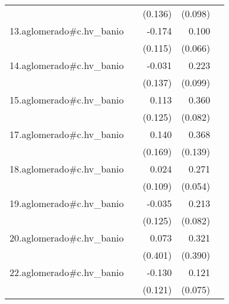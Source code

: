 {\begin{longtable}{l*{4}{D{.}{.}{-1}}}
            &                     &     (0.136)         &     (0.098)         &                     \\
\addlinespace
13.aglomerado#c.hv\_banio&                     &      -0.174         &       0.100         &                     \\
            &                     &     (0.115)         &     (0.066)         &                     \\
\addlinespace
14.aglomerado#c.hv\_banio&                     &      -0.031         &       0.223\sym{*}  &                     \\
            &                     &     (0.137)         &     (0.099)         &                     \\
\addlinespace
15.aglomerado#c.hv\_banio&                     &       0.113         &       0.360\sym{***}&                     \\
            &                     &     (0.125)         &     (0.082)         &                     \\
\addlinespace
17.aglomerado#c.hv\_banio&                     &       0.140         &       0.368\sym{**} &                     \\
            &                     &     (0.169)         &     (0.139)         &                     \\
\addlinespace
18.aglomerado#c.hv\_banio&                     &       0.024         &       0.271\sym{***}&                     \\
            &                     &     (0.109)         &     (0.054)         &                     \\
\addlinespace
19.aglomerado#c.hv\_banio&                     &      -0.035         &       0.213\sym{**} &                     \\
            &                     &     (0.125)         &     (0.082)         &                     \\
\addlinespace
20.aglomerado#c.hv\_banio&                     &       0.073         &       0.321         &                     \\
            &                     &     (0.401)         &     (0.390)         &                     \\
\addlinespace
22.aglomerado#c.hv\_banio&                     &      -0.130         &       0.121         &                     \\
            &                     &     (0.121)         &     (0.075)         &                     \\

\end{longtable}}
